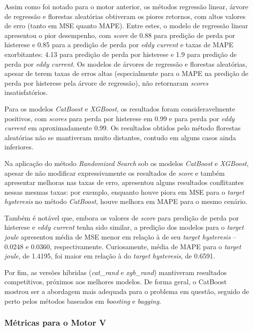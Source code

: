 \documentclass{article}
\begin{document}
Assim como foi notado para o motor anterior, os métodos regressão linear, árvore de regressão e florestas aleatórias obtiveram os piores retornos, com altos valores de erro (tanto em MSE quanto MAPE). Entre estes, o modelo de regressão linear apresentou o pior desempenho, com \textit{score} de 0.88 para predição de perda por histerese e 0.85 para a predição de perda por \textit{eddy current} e taxas de MAPE exorbitantes: 4.13 para predição de perda por histerese e 1.9 para predição de perda por \textit{eddy current}. Os modelos de árvores de regressão e florestas aleatórias, apesar de terem taxas de erros altas (especialmente para o MAPE na predição de perda por histerese pela árvore de regressão), não retornaram \textit{scores} insatisfatórios. 

Para os modelos \textit{CatBoost} e \textit{XGBoost}, os resultados foram consideravelmente positivos, com \textit{scores} para perda por histerese em 0.99 e para perda por \textit{eddy current} em aproximadamente 0.99. Os resultados obtidos pelo método florestas aleatórias não se mantiveram muito distantes, contudo em alguns casos ainda inferiores.

Na aplicação do método \textit{Randomized Search} sob os modelos \textit{CatBoost} e \textit{XGBoost}, apesar de não modificar expressivamente os resultados de \textit{score} e também apresentar melhoras nas taxas de erro, apresentou alguns resultados conflitantes nessas mesmas taxas: por exemplo, enquanto houve piora em MSE para o \textit{target hysteresis} no método \textit{CatBoost}, houve melhora em MAPE para o mesmo cenário.

Também é notável que, embora os valores de \textit{score} para predição de perda por histerese e \textit{eddy current} tenha sido similar, a predição dos modelos para o \textit{target joule} apresentou média de MSE menor em relação à de seu \textit{target hysteresis} \--- 0.0248 e 0.0360, respectivamente. Curiosamente, média de MAPE para o \textit{target joule}, de 1.4195, foi maior em relação à do \textit{target hysteresis}, de 0.6591.

Por fim, as versões híbridas (\textit{cat\_rand} e \textit{xgb\_rand}) mantiveram resultados competitivos, próximos aos melhores modelos. De forma geral, o CatBoost mostrou ser a abordagem mais adequada para o problema em questão, seguido de perto pelos métodos baseados em \textit{boosting} e \textit{bagging}.

\newpage

\subsubsection{Métricas para o Motor V}
\end{document}
